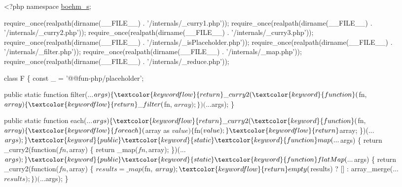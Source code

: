 \begin{DoxyCodeInclude}
<?php
\textcolor{keyword}{namespace }\hyperlink{namespaceboehm__s}{boehm\_s};

require\_once(realpath(dirname(\_\_FILE\_\_) . \textcolor{stringliteral}{'/internals/\_curry1.php'}));
require\_once(realpath(dirname(\_\_FILE\_\_) . \textcolor{stringliteral}{'/internals/\_curry2.php'}));
require\_once(realpath(dirname(\_\_FILE\_\_) . \textcolor{stringliteral}{'/internals/\_curry3.php'}));
require\_once(realpath(dirname(\_\_FILE\_\_) . \textcolor{stringliteral}{'/internals/\_isPlaceholder.php'}));
require\_once(realpath(dirname(\_\_FILE\_\_) . \textcolor{stringliteral}{'/internals/\_filter.php'}));
require\_once(realpath(dirname(\_\_FILE\_\_) . \textcolor{stringliteral}{'/internals/\_map.php'}));
require\_once(realpath(dirname(\_\_FILE\_\_) . \textcolor{stringliteral}{'/internals/\_reduce.php'}));

\textcolor{keyword}{class }F \{
    \textcolor{keyword}{const} \_ = \textcolor{stringliteral}{'@@fun-php/placeholder'};

    \textcolor{keyword}{public} \textcolor{keyword}{static} \textcolor{keyword}{function} filter(...$args) \{
        \textcolor{keywordflow}{return} \_curry2(\textcolor{keyword}{function}($fn, $array) \{
            \textcolor{keywordflow}{return} \_filter($fn, $array);
        \})(...$args);
    \}

    \textcolor{keyword}{public} \textcolor{keyword}{static} \textcolor{keyword}{function} each(...$args) \{
        \textcolor{keywordflow}{return} \_curry2(\textcolor{keyword}{function}($fn, $array) \{
            \textcolor{keywordflow}{foreach} ($array as $value) \{
                $fn($value);
            \}
            \textcolor{keywordflow}{return} $array;
        \})(...$args);
    \}

    \textcolor{keyword}{public} \textcolor{keyword}{static} \textcolor{keyword}{function} map(...$args) \{
        \textcolor{keywordflow}{return} \_curry2(\textcolor{keyword}{function}($fn, $array) \{
            \textcolor{keywordflow}{return} \_map($fn, $array);
        \})(...$args);
    \}

    \textcolor{keyword}{public} \textcolor{keyword}{static} \textcolor{keyword}{function} flatMap(...$args) \{
        \textcolor{keywordflow}{return} \_curry2(\textcolor{keyword}{function}($fn, $array) \{
            $results = \_map($fn, $array);

            \textcolor{keywordflow}{return} empty($results) ? [] : array\_merge(...$results);
        \})(...$args);
    \}


\end{DoxyCodeInclude}
